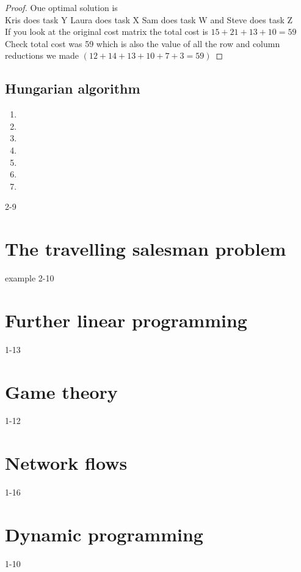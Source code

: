 \documentclass[a4paper]{article}
\begin{document}
\begin{eg}
\begin{proof}
    Oue optimal solution is\\
    
    Kris does task Y Laura does task X Sam does task W and Steve does task Z\\
    
    If you look at the original cost matrix the total cost is $15+21+13+10=59$\\
    
    Check total cost was 59 which is also the value of all the row and column reductions we made $(12+14+13+10+7+3=59)$

  \end{proof}
  
\end{eg}
\subsection{Hungarian algorithm}
\begin{enumerate}
  \item 
  \item 
  \item 
  \item 
  \item 
  \item 
  \item 
\end{enumerate}
\begin{eg}
  2-9
\end{eg}

\section{The travelling salesman problem}
\begin{eg}
  example 2-10
\end{eg}

\section{Further linear programming}
\begin{eg}
1-13
\end{eg}

\section{Game theory}
\begin{eg}
  1-12
  \end{eg}

\section{Network flows}
\begin{eg}
  1-16
  \end{eg}

\section{Dynamic programming}

\begin{eg}
  1-10
  \end{eg}
\end{document}
